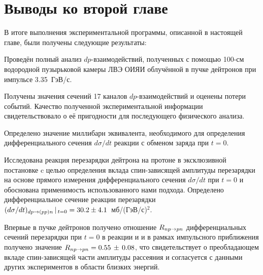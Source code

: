 \section{Выводы ко второй главе}
В итоге выполнения экспериментальной программы, описанной в настоящей главе,
были получены следующие результаты:
\begin{list}{}{\leftmargin=1em}
\item Проведён полный анализ $dp$-взаимодействий, полученных с помощью 100-см
  водородной пузырьковой камеры ЛВЭ ОИЯИ облучённой в пучке дейтронов при
  импульсе 3.35~ГэВ/с.
\item Получены значения сечений 17 каналов $dp$-взаимодействий и оценены потери
  событий. Качество полученной экспериментальной информации свидетельствовало о
  её пригодности для последующего физического анализа.
\item Определено значение миллибарн эквивалента, необходимого для определения
  дифференциального сечения $d\sigma/dt$ реакции с обменом заряда \dpchex при
  $t = 0$.
\item Исследована реакция перезарядки дейтрона на протоне в эксклюзивной
  постановке c целью определения вклада спин-зависящей амплитуды \np перезарядки
  на основе прямого измерения дифференциального сечения $d\sigma/dt$ при $t = 0$
  и обоснована применимость использованного нами подхода. Определено
  дифференциальное сечение реакции перезарядки
  $(d\sigma/dt)_{dp \rightarrow (pp)n}\,|\,_{t=0} = 30.2 \pm 4.1$~мб/(ГэВ/с)$^{2}$.
\item Впервые в пучке дейтронов получено отношение $R_{np \rightarrow pn}$ дифференциальных
  сечений перезарядки при $t=0$ в реакции \dpchex и \np и в рамках импульсного
  приближения получено
  значение $R_{np \rightarrow pn} = 0.55\,\pm\,0.08$, что свидетельствует о преобладающем
  вкладе спин-зависящей части амплитуды \np рассеяния и согласуется с данными
  других экспериментов в области близких энергий.
\end{list}

